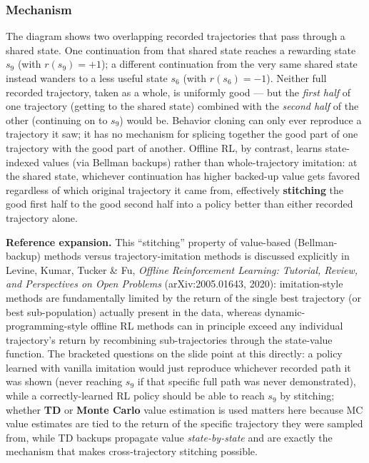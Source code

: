 \subsubsection*{Mechanism}

The diagram shows two overlapping recorded trajectories that pass through a shared state. One continuation from that shared state reaches a rewarding state $s_9$ (with $r(s_9)=+1$); a different continuation from the very same shared state instead wanders to a less useful state $s_6$ (with $r(s_6)=-1$). Neither full recorded trajectory, taken as a whole, is uniformly good --- but the \emph{first half} of one trajectory (getting to the shared state) combined with the \emph{second half} of the other (continuing on to $s_9$) would be. Behavior cloning can only ever reproduce a trajectory it saw; it has no mechanism for splicing together the good part of one trajectory with the good part of another. Offline RL, by contrast, learns state-indexed values (via Bellman backups) rather than whole-trajectory imitation: at the shared state, whichever continuation has higher backed-up value gets favored regardless of which original trajectory it came from, effectively \textbf{stitching} the good first half to the good second half into a policy better than either recorded trajectory alone.

\textbf{Reference expansion.} This ``stitching'' property of value-based (Bellman-backup) methods versus trajectory-imitation methods is discussed explicitly in Levine, Kumar, Tucker \& Fu, \emph{Offline Reinforcement Learning: Tutorial, Review, and Perspectives on Open Problems} (arXiv:2005.01643, 2020): imitation-style methods are fundamentally limited by the return of the single best trajectory (or best sub-population) actually present in the data, whereas dynamic-programming-style offline RL methods can in principle exceed any individual trajectory's return by recombining sub-trajectories through the state-value function. The bracketed questions on the slide point at this directly: a policy learned with vanilla imitation would just reproduce whichever recorded path it was shown (never reaching $s_9$ if that specific full path was never demonstrated), while a correctly-learned RL policy should be able to reach $s_9$ by stitching; whether \textbf{TD} or \textbf{Monte Carlo} value estimation is used matters here because MC value estimates are tied to the return of the specific trajectory they were sampled from, while TD backups propagate value \emph{state-by-state} and are exactly the mechanism that makes cross-trajectory stitching possible.
